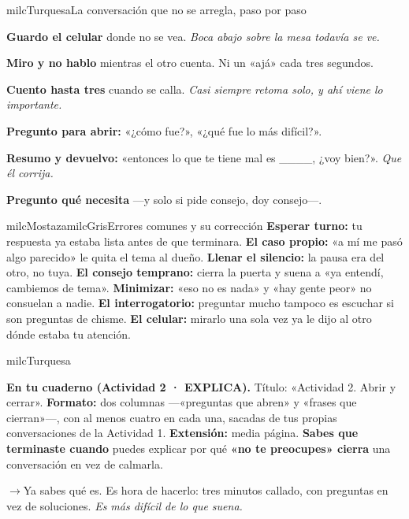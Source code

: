 \documentclass[11pt,letterpaper]{article}
\newcommand{\puente}[1]{%
  \begin{puentebox}%
    \textcolor{milcGradeDark}{$\rightarrow$}\hspace{2mm}#1%
  \end{puentebox}%
}
\begin{document}
\begin{drawbox}{milcTurquesa}{La conversación que no se arregla, paso por paso}
\begin{pasoslista}
\item \textbf{Guardo el celular} donde no se vea. \emph{Boca abajo sobre la mesa todavía se ve.}
\item \textbf{Miro y no hablo} mientras el otro cuenta. Ni un «ajá» cada tres segundos.
\item \textbf{Cuento hasta tres} cuando se calla. \emph{Casi siempre retoma solo, y ahí viene lo importante.}
\item \textbf{Pregunto para abrir:} «¿cómo fue?», «¿qué fue lo más difícil?».
\item \textbf{Resumo y devuelvo:} «entonces lo que te tiene mal es \_\_\_\_, ¿voy bien?». \emph{Que él corrija.}
\item \textbf{Pregunto qué necesita} ---y solo si pide consejo, doy consejo---.
\end{pasoslista}
\end{drawbox}

\begin{softbox}{milcMostaza}{milcGris}{Errores comunes y su corrección}
\textbf{Esperar turno:} tu respuesta ya estaba lista antes de que terminara. \textbf{El caso propio:} «a mí me pasó algo parecido» le quita el tema al dueño. \textbf{Llenar el silencio:} la pausa era del otro, no tuya. \textbf{El consejo temprano:} cierra la puerta y suena a «ya entendí, cambiemos de tema». \textbf{Minimizar:} «eso no es nada» y «hay gente peor» no consuelan a nadie. \textbf{El interrogatorio:} preguntar mucho tampoco es escuchar si son preguntas de chisme. \textbf{El celular:} mirarlo una sola vez ya le dijo al otro dónde estaba tu atención.
\end{softbox}

\begin{infoband}{milcTurquesa}


\textbf{En tu cuaderno (Actividad 2 · EXPLICA).} Título: «Actividad 2. Abrir y cerrar». \textbf{Formato:} dos columnas ---«preguntas que abren» y «frases que cierran»---, con al menos cuatro en cada una, sacadas de tus propias conversaciones de la Actividad 1. \textbf{Extensión:} media página. \textbf{Sabes que terminaste cuando} puedes explicar por qué \textbf{«no te preocupes» cierra} una conversación en vez de calmarla.
\end{infoband}

\puente{Ya sabes qué es. Es hora de hacerlo: tres minutos callado, con preguntas en vez de soluciones. \emph{Es más difícil de lo que suena.}}
\end{document}
